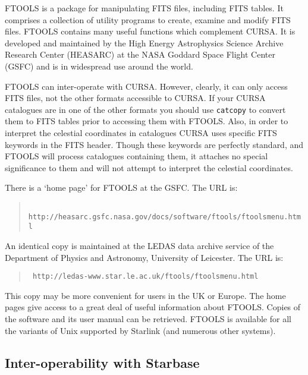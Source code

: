 \documentclass[twoside,11pt]{article}
\newcommand{\htmladdnormallink}[2]{#1}
\renewcommand{\_}{\texttt{\symbol{95}}}
\begin{document}
FTOOLS is a package for manipulating FITS files, including FITS tables.
It comprises a collection of utility programs to create, examine and
modify FITS files.  FTOOLS contains many useful functions which
complement CURSA.  It is developed and maintained by the High Energy
Astrophysics Science Archive Research Center (HEASARC) at the NASA
Goddard Space Flight Center (GSFC) and is in widespread use around the
world.

FTOOLS can inter-operate with CURSA.  However, clearly, it can only
access FITS files, not the other formats accessible to CURSA.  If
your CURSA catalogues are in one of the other formats you should use
{\tt catcopy} to convert them to FITS tables prior to accessing them
with FTOOLS.  Also, in order to interpret the celestial coordinates
in catalogues CURSA uses specific FITS keywords in the FITS header.
Though these keywords are perfectly standard, and FTOOLS will process
catalogues containing them, it attaches no special significance to them
and will not attempt to interpret the celestial coordinates.

There is a `home page' for FTOOLS at the GSFC.  The URL is:

\begin{quote}
\htmladdnormallink{{\tt 
http://heasarc.gsfc.nasa.gov/docs/software/ftools/ftools\_menu.html}}
{http://heasarc.gsfc.nasa.gov/docs/software/ftools/ftools_menu.html}
\end{quote}

An identical copy is maintained at the LEDAS data archive service of
the Department of Physics and Astronomy, University of Leicester.  The
URL is:

\begin{quote}
\htmladdnormallink{{\tt 
http://ledas-www.star.le.ac.uk/ftools/ftools\_menu.html}}
{http://ledas-www.star.le.ac.uk/ftools/ftools_menu.html}
\end{quote}

This copy may be more convenient for users in the UK or Europe.  The
home pages give access to a great deal of useful information about
FTOOLS.  Copies of the software and its user manual can be retrieved.
FTOOLS is available for all the variants of Unix supported by Starlink
(and numerous other systems).

\subsection{\label{STARBASE}Inter-operability with Starbase}
\end{document}
